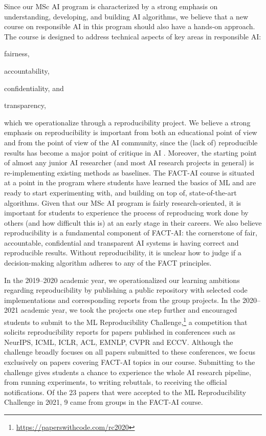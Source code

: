 Since our MSc AI program is characterized by a strong emphasis on understanding, developing, and building AI algorithms, we believe that a new course on responsible AI in this program should also have a hands-on approach.
The course is designed to address technical aspects of key areas in responsible AI:
\begin{enumerate*}[label=(\roman*)]
\item fairness, 
\item accountability, 
\item confidentiality, and 
\item transparency,  
\end{enumerate*}
which we operationalize through a reproducibility project. 
We believe a strong emphasis on reproducibility is important from both an educational point of view and from the point of view of the AI community, since the (lack of) reproducible results has become a major point of critique in AI \citep{hutson2018artificial}. 
Moreover, the starting point of almost any junior AI researcher (and most AI research projects in general) is re-implementing existing methods as baselines. 
The FACT-AI course is situated at a point in the program where students have learned the basics of ML and are ready to start experimenting with, and building on top of, state-of-the-art algorithms. 
Given that our MSc AI program is fairly research-oriented, it is important for students to experience the process of reproducing work done by others (and how difficult this is) at an early stage in their careers. 
We also believe reproducibility is a fundamental component of FACT-AI: the cornerstone of fair, accountable, confidential and transparent AI systems is having correct and reproducible results. 
Without reproducibility, it is unclear how to judge if a decision-making algorithm adheres to any of the FACT principles. 

In the 2019--2020 academic year, we operationalized our learning ambitions regarding reproducibility by publishing a public repository with selected code implementations and corresponding reports from the group projects.
In the 2020--2021 academic year, we took the projects one step further and encouraged students to submit to the ML Reproducibility Challenge,\footnote{\url{https://paperswithcode.com/rc2020}} a competition that solicits reproducibility reports for papers published in conferences such as NeurIPS, ICML, ICLR, ACL, EMNLP, CVPR and ECCV. 
Although the challenge broadly focuses on all papers submitted to these conferences, we focus exclusively on papers covering FACT-AI topics in our course. 
Submitting to the challenge gives students a chance to experience the whole AI research pipeline, from running experiments, to writing rebuttals, to receiving the official notifications. 
Of the 23 papers that were accepted to the ML Reproducibility Challenge in 2021, 9 came from groups in the FACT-AI course. 

